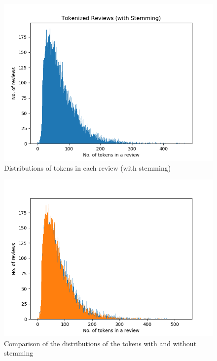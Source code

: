 \begin{figure}[!h]
	\centering
	\caption{Distributions of tokens in each review (with stemming)}
	\includegraphics[scale=0.5]{figures/stem_review.png}
\end{figure}
\newpage
\begin{figure}[!h]
	\centering
	\caption{Comparison of the distributions of the tokens with and without stemming}
	\includegraphics[scale=0.5]{figures/token_stem_review.png}
\end{figure}

